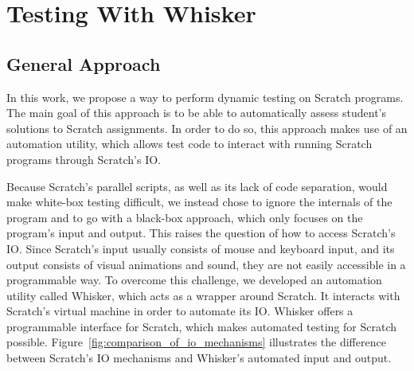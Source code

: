
\chapter{Testing With Whisker}
\label{cha:appraoch}


\section{General Approach}
\label{sec:general_appraoch}

In this work, we propose a way to perform dynamic testing on Scratch programs.
The main goal of this approach is to be able to automatically assess student's solutions to Scratch assignments.
In order to do so, this approach makes use of an automation utility, which allows test code to interact with running Scratch programs through Scratch's IO.
\parspace

Because Scratch's parallel scripts, as well as its lack of code separation, would make white-box testing difficult,
we instead chose to ignore the internals of the program and to go with a black-box approach, which only focuses on the program's input and output.
This raises the question of how to access Scratch's IO.
Since Scratch's input usually consists of mouse and keyboard input, and its output consists of visual animations and sound,
they are not easily accessible in a programmable way.
To overcome this challenge, we developed an automation utility called Whisker, which acts as a wrapper around Scratch.
It interacts with Scratch's virtual machine in order to automate its IO.
Whisker offers a programmable interface for Scratch, which makes automated testing for Scratch possible.
Figure~\ref{fig:comparison_of_io_mechanisms} illustrates the difference between Scratch's IO mechanisms and Whisker's automated input and output.

